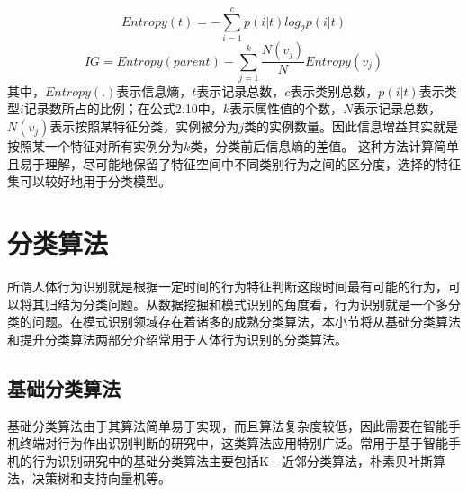 \begin{equation}
	Entropy(t) = -\sum_{i=1}^{c}p(i|t)log_2p(i|t)
\end{equation}
\begin{equation}
	IG = Entropy(parent) - \sum_{j=1}^{k}\frac{N(v_j)}{N}Entropy(v_j)
\end{equation}
其中，$Entropy(.)$表示信息熵，$t$表示记录总数，$c$表示类别总数，$p(i|t)$表示类型$i$记录数所占的比例；在公式2.10中，$k$表示属性值的个数，$N$表示记录总数，$N(v_j)$表示按照某特征分类，实例被分为$j$类的实例数量。因此信息增益其实就是按照某一个特征对所有实例分为$k$类，分类前后信息熵的差值。
这种方法计算简单且易于理解，尽可能地保留了特征空间中不同类别行为之间的区分度，选择的特征集可以较好地用于分类模型。

\section{分类算法}
\par 所谓人体行为识别就是根据一定时间的行为特征判断这段时间最有可能的行为，可以将其归结为分类问题。从数据挖掘和模式识别的角度看，行为识别就是一个多分类的问题。在模式识别领域存在着诸多的成熟分类算法，本小节将从基础分类算法和提升分类算法两部分介绍常用于人体行为识别的分类算法。

\subsection{基础分类算法}
\par 基础分类算法由于其算法简单易于实现，而且算法复杂度较低，因此需要在智能手机终端对行为作出识别判断的研究中，这类算法应用特别广泛。常用于基于智能手机的行为识别研究中的基础分类算法主要包括K－近邻分类算法，朴素贝叶斯算法，决策树和支持向量机等。

